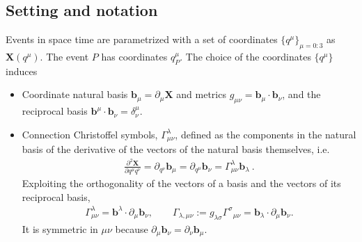 \documentclass[letterpaper,10pt,english]{jupyterBook}
\begin{document}
\subsection{Setting and notation}
\label{\detokenize{ch/relativity-general/local-inertial-reference-frame-and-equivalence-principle:setting-and-notation}}\label{\detokenize{ch/relativity-general/local-inertial-reference-frame-and-equivalence-principle:general-relativity-local-inertial-reference-frame-introduction}}
\sphinxAtStartPar
Events in space time are parametrized with a set of coordinates \(\{ q^\mu \}_{\mu=0:3}\) as \(\mathbf X(q^\mu)\). The event \(P\) has coordinates \(q_P^\mu\). The choice of the coordinates \(\{ q^\mu \}\) induces
\begin{itemize}
\item {} 
\sphinxAtStartPar
Coordinate natural basis \(\mathbf{b}_\mu=\partial_\mu\mathbf{X}\) and metrics \(g_{\mu\nu}=\mathbf{ b}_\mu \cdot \mathbf{ b}_\nu\), and the reciprocal basis \(\mathbf{ b}^\mu\cdot\mathbf {b}_\nu=\delta^\mu_\nu\).

\item {} 
\sphinxAtStartPar
Connection \sphinxhyphen{} Christoffel symbols, \(\Gamma_{\mu \nu}^{\lambda}\), defined as the components in the natural basis of the derivative of the vectors of the natural basis themselves, i.e.
\begin{equation*}
\begin{split}\frac{\partial^2\mathbf{X}}{\partial q^{\mu} q^{\nu}} = \partial_{q^{\nu}} \mathbf{b}_{\mu} = \partial_{q^{\mu}} \mathbf{b}_{\nu} = \Gamma_{\mu \nu}^{\lambda} \mathbf{b}_{\lambda} \ .\end{split}
\end{equation*}
\sphinxAtStartPar
Exploiting the orthogonality of the vectors of a basis and the vectors of its reciprocal basis,
\begin{equation*}
\begin{split}
   \Gamma^\lambda_{\mu\nu}=\mathbf b^\lambda\cdot\partial_\mu\mathbf b_\nu,\qquad
   \Gamma_{\lambda,\mu\nu}:=g_{\lambda\sigma}\Gamma^\sigma{}_{\mu\nu}=\mathbf b_\lambda\cdot\partial_\mu\mathbf b_\nu .
   \end{split}
\end{equation*}
\sphinxAtStartPar
It is symmetric in \(\mu\nu\) because \(\partial_\mu\mathbf b_\nu=\partial_\nu\mathbf b_\mu\).

\end{itemize}
\end{document}
